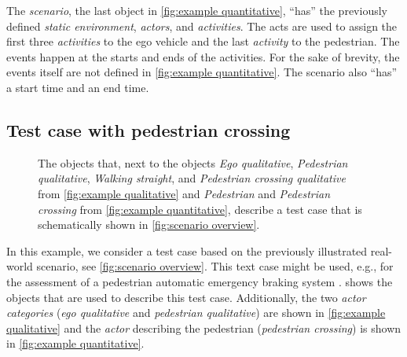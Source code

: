 The \textit{scenario}, the last object in \cref{fig:example quantitative}, ``has'' the previously defined \textit{static environment}, \textit{actors}, and \textit{activities}. The acts are used to assign the first three \textit{activities} to the ego vehicle and the last \textit{activity} to the pedestrian. The events happen at the starts and ends of the activities. For the sake of brevity, the events itself are not defined in \cref{fig:example quantitative}. The scenario also ``has'' a start time and an end time.

\subsection{Test case with pedestrian crossing}
\label{sec:example test case}

\cbend
\begin{figure}
	\centering
	
	\caption{\cbstartc The objects that, next to the objects \emph{Ego qualitative}, \emph{Pedestrian qualitative}, \emph{Walking straight}, and \emph{Pedestrian crossing qualitative} from \cref{fig:example qualitative} and \emph{Pedestrian} and \emph{Pedestrian crossing} from \cref{fig:example quantitative}, describe a test case that is schematically shown in \cref{fig:scenario overview}.\cbend}
	\label{fig:example test case}
\end{figure}

\cbstartd
In this example, we consider a test case based on the previously illustrated real-world scenario, see \cref{fig:scenario overview}. This text case might be used, e.g., for the assessment of a pedestrian automatic emergency braking system \cite{seiniger2015test}.  shows the objects that are used to describe this test case. Additionally, the two \textit{actor categories} (\emph{ego qualitative} and \emph{pedestrian qualitative}) are shown in \cref{fig:example qualitative} and the \textit{actor} describing the pedestrian (\emph{pedestrian crossing}) is shown in \cref{fig:example quantitative}.
\cbend
\cbstart

